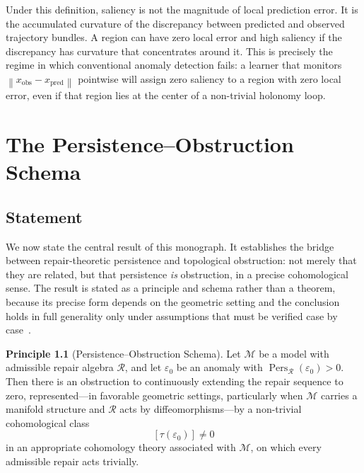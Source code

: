 \documentclass[12pt,oneside]{book}
\theoremstyle{plain}
\theoremstyle{definition}
\newtheorem{principle}[theorem]{Principle}
\theoremstyle{remark}
\DeclareMathOperator{\Pers}{Pers}
\newcommand{\R}{\mathcal{R}}
\newcommand{\M}{\mathcal{M}}
\newcommand{\eps}{\varepsilon}
\newcommand{\norm}[1]{\left\lVert #1 \right\rVert}
\newcommand{\1}{\mathbf{1}}
\begin{document}
Under this definition, saliency is not the magnitude of local prediction error. It is the accumulated curvature of the discrepancy between predicted and observed trajectory bundles. A region can have zero local error and high saliency if the discrepancy has curvature that concentrates around it. This is precisely the regime in which conventional anomaly detection fails: a learner that monitors $\norm{x_{\mathrm{obs}} - x_{\mathrm{pred}}}$ pointwise will assign zero saliency to a region with zero local error, even if that region lies at the center of a non-trivial holonomy loop.


\chapter{The Persistence--Obstruction Schema}

\section{Statement}

We now state the central result of this monograph. It establishes the bridge between repair-theoretic persistence and topological obstruction: not merely that they are related, but that persistence \emph{is} obstruction, in a precise cohomological sense. The result is stated as a principle and schema rather than a theorem, because its precise form depends on the geometric setting and the conclusion holds in full generality only under assumptions that must be verified case by case~\cite{hatcher2002,spanier1966}.

\begin{principle}[Persistence--Obstruction Schema]
\label{principle:main}
Let $\M$ be a model with admissible repair algebra $\R$, and let $\eps_0$ be an anomaly with $\Pers_{\R}(\eps_0) > 0$. Then there is an obstruction to continuously extending the repair sequence to zero, represented---in favorable geometric settings, particularly when $\M$ carries a manifold structure and $\R$ acts by diffeomorphisms---by a non-trivial cohomological class
\[
[\tau(\eps_0)] \neq 0
\]
in an appropriate cohomology theory associated with $\M$, on which every admissible repair acts trivially.
\end{principle}
\end{document}
